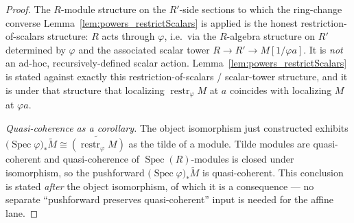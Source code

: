 \begin{proof}
  The \(R\)-module structure on the \(R'\)-side sections to which the ring-change
  converse Lemma~\ref{lem:powers_restrictScalars} is applied is the honest
  restriction-of-scalars structure: \(R\) acts through \(\varphi\), i.e.\ via the
  \(R\)-algebra structure on \(R'\) determined by \(\varphi\) and the associated
  scalar tower \(R \to R' \to M[1/\varphi a]\). It is \emph{not} an ad-hoc,
  recursively-defined scalar action. Lemma~\ref{lem:powers_restrictScalars} is
  stated against exactly this restriction-of-scalars / scalar-tower structure, and
  it is under that structure that localizing \(\operatorname{restr}_\varphi M\) at
  \(a\) coincides with localizing \(M\) at \(\varphi a\).

  \medskip
  \emph{Quasi-coherence as a corollary.} The object isomorphism just constructed
  exhibits \(\bigl(\operatorname{Spec}\varphi\bigr)_*\widetilde{M} \cong
  \widetilde{(\operatorname{restr}_\varphi M)}\) as the tilde of a module. Tilde
  modules are quasi-coherent and quasi-coherence of \(\operatorname{Spec}(R)\)-modules
  is closed under isomorphism, so the pushforward
  \(\bigl(\operatorname{Spec}\varphi\bigr)_*\widetilde{M}\) is quasi-coherent. This
  conclusion is stated \emph{after} the object isomorphism, of which it is a
  consequence — no separate ``pushforward preserves quasi-coherent'' input is
  needed for the affine lane.
\end{proof}

